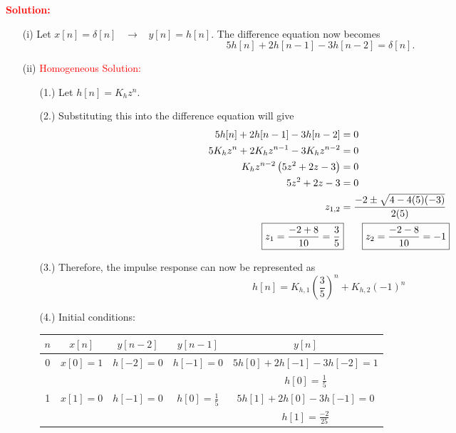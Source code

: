 \documentclass[a4paper, 12pt]{article}
\begin{document}
\begin{itemize}
\begin{itemize}
\textcolor{red}{\textbf{Solution:}}
\begin{itemize}
\item[(i)]{Let $x[n] = \delta[n] \; \; \; \rightarrow \; \; \; y[n] = h[n]$. The difference equation now becomes}
\begin{equation}
5h[n] + 2h[n-1] - 3h[n-2] = \delta[n].
\label{eq:2a_difference_equation}
\end{equation}
\item[(ii)]{\textcolor{red}{Homogeneous Solution:}}
\begin{itemize}
\item[(1.)]{Let $h[n] = K_{h}z^{n}$.}
\item[(2.)]{Substituting this into the difference equation will give}
\begin{equation}
\begin{gathered}
\begin{alignedat}{1}
5h[n] + 2h[n-1] - 3h[n-2] &= 0 \\
5K_{h}z^{n} + 2K_{h}z^{n-1} - 3 K_{h}z^{n-2} &= 0 \\
K_{h}z^{n-2} \left( 5z^{2} + 2z - 3 \right) &= 0 \\
5z^{2} + 2z - 3 &= 0 \\
z_{1,2} &= \frac{-2 \pm \sqrt{4 - 4(5)(-3)}}{2(5)} \\
\Aboxed{z_{1} = \frac{-2 + 8}{10} = \frac{3}{5}} \Aboxed{z_{2} = \frac{-2 - 8}{10} = -1}
\end{alignedat}
\end{gathered}
\end{equation}
\item[(3.)]{Therefore, the impulse response can now be represented as}
\begin{equation}
h[n] = K_{h, 1} \left(\frac{3}{5} \right)^{n} + K_{h, 2} \left(-1 \right)^{n}
\end{equation}
\item[(4.)]{Initial conditions:} \\
\begin{center}
\begin{tabular}{|c |c | c | c |c|}
\hline
$n$ & $x[n]$ & $y[n-2]$ & $y[n-1]$ & $y[n]$ \\
\hline
0 & $x[0] = 1$ & $h[-2] = 0$ & $h[-1] = 0$ & $5h[0] + 2h[-1] - 3 h[-2] = 1$ \\
& & & & $h[0] = \frac{1}{5}$ \\
\hline
1 & $x[1] = 0$ & $h[-1] = 0$ & $h[0] = \frac{1}{5}$ & $5h[1] + 2h[0] - 3h[-1] = 0$ \\
& & & & $h[1] = \frac{-2}{25}$ \\

\end{tabular}
\end{center}
\end{itemize}
\end{itemize}
\end{itemize}
\end{itemize}
\end{document}
